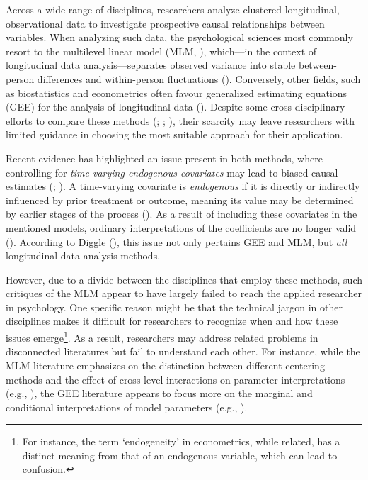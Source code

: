 \documentclass[
  12pt,
  a4paper,
]{article}
\begin{document}
Across a wide range of disciplines, researchers analyze clustered
longitudinal, observational data to investigate prospective causal
relationships between variables. When analyzing such data, the
psychological sciences most commonly resort to the multilevel linear
model (MLM, ),
which---in the context of longitudinal data analysis---separates
observed variance into stable between-person differences and
within-person fluctuations (). Conversely, other fields, such as biostatistics and
econometrics often favour generalized estimating equations (GEE) for the
analysis of longitudinal data (). Despite some cross-disciplinary efforts to compare these
methods (;
; ), their scarcity may leave researchers with limited
guidance in choosing the most suitable approach for their application.

Recent evidence has highlighted an issue present in both methods, where
controlling for \emph{time-varying endogenous covariates} may lead to
biased causal estimates (; ). A time-varying
covariate is \emph{endogenous} if it is directly or indirectly
influenced by prior treatment or outcome, meaning its value may be
determined by earlier stages of the process
(). As a result of including
these covariates in the mentioned models, ordinary interpretations of
the coefficients are no longer valid (). According to Diggle
(), this issue not only pertains GEE and
MLM, but \emph{all} longitudinal data analysis methods.

However, due to a divide between the disciplines that employ these
methods, such critiques of the MLM appear to have largely failed to
reach the applied researcher in psychology. One specific reason might be
that the technical jargon in other disciplines makes it difficult for
researchers to recognize when and how these issues emerge\footnote{For
  instance, the term `endogeneity' in econometrics, while related, has a
  distinct meaning from that of an endogenous variable, which can lead
  to confusion.}. As a result, researchers may address related problems
in disconnected literatures but fail to understand each other. For
instance, while the MLM literature emphasizes on the distinction between
different centering methods and the effect of cross-level interactions
on parameter interpretations (e.g., ), the GEE literature appears to focus more on the
marginal and conditional interpretations of model parameters (e.g.,
).
\end{document}
